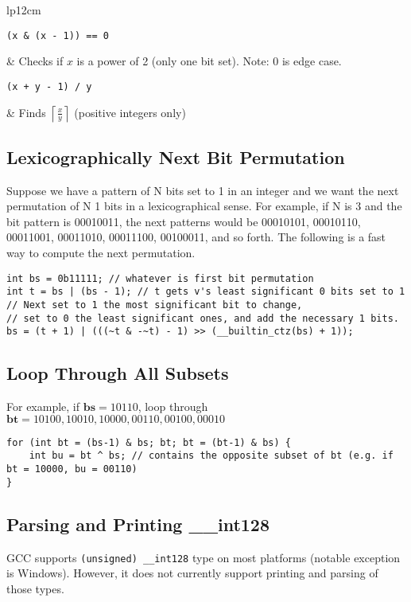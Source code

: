 \documentclass[letterpaper]{article}
\begin{document}
\begin{tabular}{lp{12cm}}
    \begin{lstlisting}
(x & (x - 1)) == 0
\end{lstlisting}                     & Checks if $x$ is a power of 2 (only one bit set). Note: 0 is edge case.                                                                                                                  \\
    \begin{lstlisting}
(x + y - 1) / y
\end{lstlisting}                     & Finds $\left\lceil\frac xy\right\rceil$ (positive integers only)                                                                                                                         \\
\end{tabular}

\subsection{Lexicographically Next Bit Permutation}
Suppose we have a pattern of N bits set to 1 in an integer and we want the next permutation of N 1 bits in a lexicographical sense. For example, if N is 3 and the bit pattern is 00010011, the next patterns would be 00010101, 00010110, 00011001, 00011010, 00011100, 00100011, and so forth. The following is a fast way to compute the next permutation.

\begin{lstlisting}
int bs = 0b11111; // whatever is first bit permutation
int t = bs | (bs - 1); // t gets v's least significant 0 bits set to 1
// Next set to 1 the most significant bit to change,
// set to 0 the least significant ones, and add the necessary 1 bits.
bs = (t + 1) | (((~t & -~t) - 1) >> (__builtin_ctz(bs) + 1));
\end{lstlisting}

\subsection{Loop Through All Subsets}
For example, if $\mathbf{bs} = 10110$, loop through $\mathbf{bt} = 10100, 10010, 10000, 00110, 00100, 00010$

\begin{lstlisting}
for (int bt = (bs-1) & bs; bt; bt = (bt-1) & bs) {
	int bu = bt ^ bs; // contains the opposite subset of bt (e.g. if bt = 10000, bu = 00110)
}
\end{lstlisting}

\subsection{Parsing and Printing \_\_int128}
GCC supports \texttt{(unsigned) \_\_int128} type on most platforms (notable exception is Windows). However, it does not currently support printing and parsing of those types.
\end{document}
